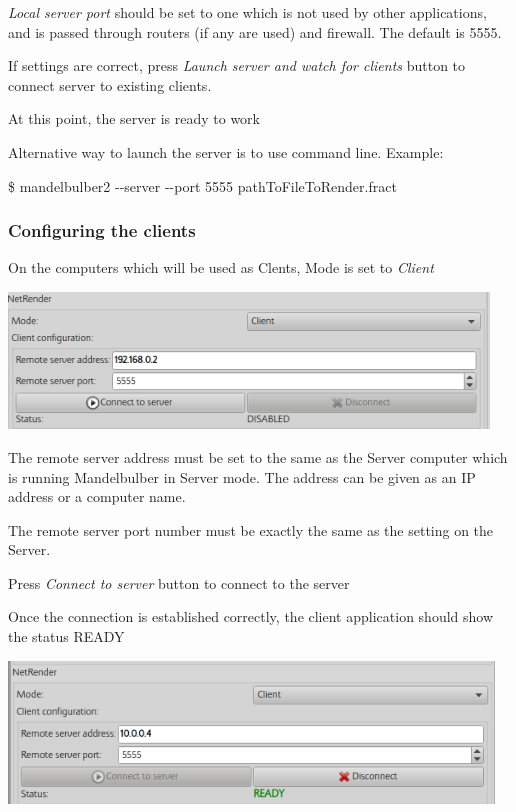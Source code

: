 \emph{Local server port} should be set to one which is not used by other
applications, and is passed through routers (if any are used) and
firewall. The default is 5555.

If settings are correct, press \emph{Launch server and watch for
clients} button to connect server to existing clients.

At this point, the server is ready to work

Alternative way to launch the server is to use command line. Example:

\$ mandelbulber2 -\/-server -\/-port 5555 pathToFileToRender.fract

\subsubsection{Configuring the clients}\label{configuring-the-clients}

On the computers which will be used as Clents, Mode is set to
\emph{Client}

\includegraphics[width=5.02441in,height=1.43071in]{img/manual/media/image30.png}

The remote server address must be set to the same as the Server computer
which is running Mandelbulber in Server mode. The address can be given
as an IP address or a computer name.

The remote server port number must be exactly the same as the setting on
the Server.

Press \emph{Connect to server} button to connect to the server

Once the connection is established correctly, the client application
should show the status READY

\includegraphics[width=5.07283in,height=1.48976in]{img/manual/media/image31.png}

